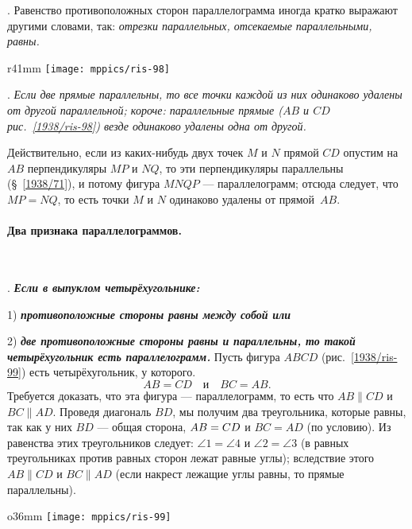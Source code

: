{\small
\smallskip
{}.
Равенство противоположных сторон параллелограмма иногда кратко выражают другими словами, так:
\emph{отрезки параллельных, отсекаемые параллельными, равны.}

}

{

\begin{wrapfigure}{r}{41mm}
\centering
\vskip-6mm
\texttt{[image: mppics/ris-98]}
\caption{}\label{1938/ris-98}
\end{wrapfigure}

\smallskip
\mbox{.}
\emph{Если две прямые параллельны, то все точки каждой из них одинаково удалены от другой параллельной;
короче:
параллельные прямые \emph{($AB$ и $CD$ рис.~\ref{1938/ris-98})} везде одинаково удалены одна от другой.}

Действительно, если из каких-нибудь двух точек $M$ и $N$ прямой $CD$ опустим на $AB$ перпендикуляры $MP$ и $NQ$, то эти перпендикуляры параллельны (§~\ref{1938/71}), и потому фигура $MNQP$ — параллелограмм;
отсюда следует, что $MP=NQ$, то есть точки $M$ и $N$ одинаково удалены от прямой~$AB$.

}

\paragraph{Два признака параллелограммов.}\label{1938/89}\ 

\smallskip
\mbox{.}
\textbf{\emph{Если в выпуклом четырёхугольнике:}}

1) \textbf{\emph{противоположные стороны равны между собой или}}

2) \textbf{\emph{две противоположные стороны равны и параллельны, то такой четырёхугольник есть параллелограмм.}}
Пусть фигура $ABCD$ (рис.~\ref{1938/ris-99}) есть четырёхугольник, у которого.
\[AB=CD\quad \text{и}\quad BC=AB.\]
Требуется доказать, что эта фигура — параллелограмм, то есть что $AB\parallel CD$ и $BC \parallel AD$.
Проведя диагональ $BD$, мы получим два треугольника, которые равны, так как у них $BD$ — общая сторона, $AB\z=CD$ и $BC = AD$ (по условию).
Из равенства этих треугольников следует:
$\angle 1 = \angle 4 $ и $\angle 2 = \angle 3$ (в равных треугольниках против равных сторон лежат равные углы);
вследствие этого $AB \parallel CD$ и $BC\parallel AD$ (если накрест лежащие углы равны, то прямые параллельны).

\begin{wrapfigure}{o}{36mm}
\centering
\texttt{[image: mppics/ris-99]}
\caption{}\label{1938/ris-99}
\end{wrapfigure}

